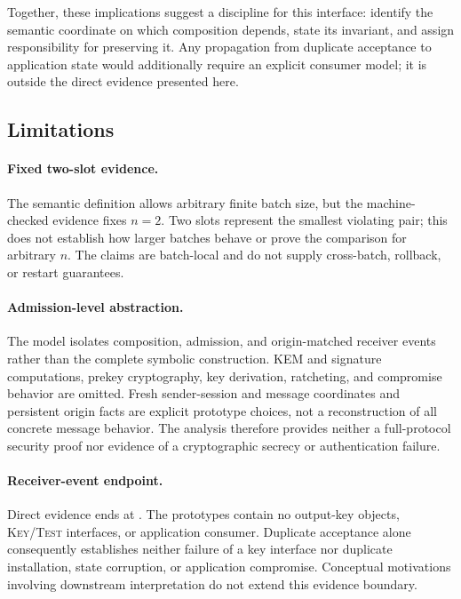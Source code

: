 Together, these implications suggest a discipline for this interface:
identify the semantic coordinate on which composition depends, state its
invariant, and assign responsibility for preserving it. Any propagation from
duplicate acceptance to application state would additionally require an
explicit consumer model; it is outside the direct evidence presented here.

\subsection{Limitations}

\paragraph{Fixed two-slot evidence.}
The semantic definition allows arbitrary finite batch size, but the
machine-checked evidence fixes \(n=2\). Two slots represent the smallest
violating pair; this does not establish how larger batches behave or prove
the comparison for arbitrary \(n\). The claims are batch-local and do not
supply cross-batch, rollback, or restart guarantees.

\paragraph{Admission-level abstraction.}
The model isolates composition, admission, and origin-matched receiver
events rather than the complete symbolic \kwaay construction. KEM and
signature computations, prekey cryptography, key derivation, ratcheting, and
compromise behavior are omitted. Fresh sender-session and message coordinates
and persistent origin facts are explicit prototype choices, not a
reconstruction of all concrete message behavior. The analysis therefore
provides neither a full-protocol security proof nor evidence of a
cryptographic secrecy or authentication failure.

\paragraph{Receiver-event endpoint.}
Direct evidence ends at \receiveraccept. The prototypes contain no output-key
objects, \textsc{Key}/\textsc{Test} interfaces, or application consumer.
Duplicate acceptance alone consequently establishes neither failure of a
key interface nor duplicate installation, state corruption, or application
compromise. Conceptual motivations involving downstream interpretation do
not extend this evidence boundary.

